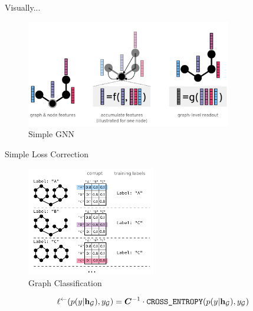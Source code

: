 \documentclass{beamer}
\begin{document}
    \begin{frame}{Visually...}
        \begin{figure}
            \centering
            \includegraphics[width=0.8\textwidth]{imgs/gnn}
            \caption{Simple GNN}
            \label{fig:gnn}
        \end{figure}
    \end{frame}

    \begin{frame}{Simple Loss Correction}
        \begin{figure}
            \centering
            \includegraphics[width=0.5\textwidth]{imgs/scheme}
            \caption{Graph Classification~\cite{my_lld2019}}
            \label{fig:lld2019}
        \end{figure}
        $$\ell^{\leftarrow}(p(y|{\mathbf{h}}_{\mathcal{G}}), y_{\mathcal{G}}) = {\bm{C}}^{-1} \cdot  \texttt{CROSS\_ENTROPY} (p(y|{\mathbf{h}}_{\mathcal{G}}), y_{\mathcal{G}})$$
    \end{frame}
\end{document}
